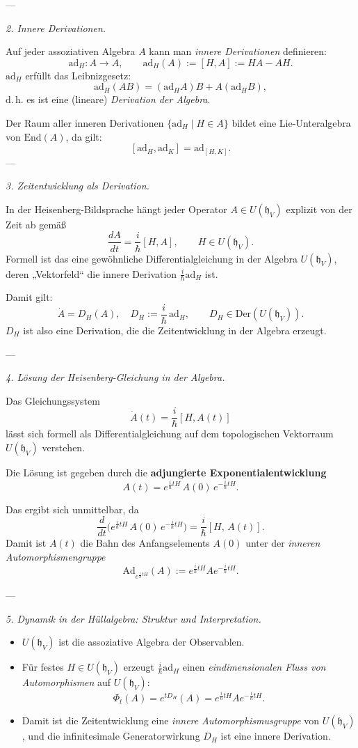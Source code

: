 \documentclass[10pt, letterpaper]{article}
\newcommand{\End}{\mathrm{End}}
\begin{document}
---

\emph{2. Innere Derivationen.}

Auf jeder assoziativen Algebra \(A\) kann man \emph{innere Derivationen} definieren:
\[
\mathrm{ad}_H: A \to A, \qquad \mathrm{ad}_H(A) := [H,A] := HA - AH.
\]
\(\mathrm{ad}_H\) erfüllt das Leibnizgesetz:
\[
\mathrm{ad}_H(AB) = (\mathrm{ad}_H A)B + A(\mathrm{ad}_H B),
\]
d.\,h. es ist eine (lineare) \emph{Derivation der Algebra}.

Der Raum aller inneren Derivationen \(\{\mathrm{ad}_H\mid H\in A\}\)
bildet eine Lie-Unteralgebra von \(\End(A)\),
da gilt:
\[
[\mathrm{ad}_H,\mathrm{ad}_K] = \mathrm{ad}_{[H,K]}.
\]
---

\emph{3. Zeitentwicklung als Derivation.}

In der Heisenberg-Bildsprache hängt jeder Operator \(A\in U(\mathfrak{h}_V)\)
explizit von der Zeit ab gemäß
\[
\frac{dA}{dt} = \frac{i}{\hbar}[H,A],
\qquad H\in U(\mathfrak{h}_V).
\]
Formell ist das eine gewöhnliche Differentialgleichung in der Algebra \(U(\mathfrak{h}_V)\),
deren „Vektorfeld“ die innere Derivation \(\frac{i}{\hbar}\mathrm{ad}_H\) ist.

Damit gilt:
\[
\boxed{\dot{A} = D_H(A),\quad D_H:=\frac{i}{\hbar}\,\mathrm{ad}_H,\qquad D_H\in\mathrm{Der}(U(\mathfrak{h}_V)).}
\]
\(D_H\) ist also eine Derivation, die die Zeitentwicklung in der Algebra erzeugt.

---

\emph{4. Lösung der Heisenberg-Gleichung in der Algebra.}

Das Gleichungssystem
\[
\dot{A}(t) = \frac{i}{\hbar}[H,A(t)]
\]
lässt sich formell als Differentialgleichung auf dem topologischen Vektorraum \(U(\mathfrak{h}_V)\) verstehen.

Die Lösung ist gegeben durch die \textbf{adjungierte Exponentialentwicklung}
\[
A(t) = e^{\frac{i}{\hbar}tH}\,A(0)\,e^{-\frac{i}{\hbar}tH}.
\]

Das ergibt sich unmittelbar, da
\[
\frac{d}{dt}\big(e^{\frac{i}{\hbar}tH}\,A(0)\,e^{-\frac{i}{\hbar}tH}\big)
=\frac{i}{\hbar}[H,\,A(t)].
\]
Damit ist \(A(t)\) die Bahn des Anfangselements \(A(0)\)
unter der \emph{inneren Automorphismengruppe}
\[
\mathrm{Ad}_{e^{\frac{i}{\hbar}tH}}(A) := e^{\frac{i}{\hbar}tH} A e^{-\frac{i}{\hbar}tH}.
\]

---

\emph{5. Dynamik in der Hüllalgebra: Struktur und Interpretation.}

\begin{itemize}
\item \(U(\mathfrak{h}_V)\) ist die assoziative Algebra der Observablen.
\item Für festes \(H\in U(\mathfrak{h}_V)\)
      erzeugt \(\frac{i}{\hbar}\mathrm{ad}_H\)
      einen \emph{eindimensionalen Fluss von Automorphismen} auf \(U(\mathfrak{h}_V)\):
      \[
      \Phi_t(A) = e^{tD_H}(A) = e^{\frac{i}{\hbar}tH} A e^{-\frac{i}{\hbar}tH}.
      \]
\item Damit ist die Zeitentwicklung eine \emph{innere Automorphismusgruppe} von \(U(\mathfrak{h}_V)\),
      und die infinitesimale Generatorwirkung \(D_H\) ist eine innere Derivation.
\end{itemize}
\end{document}

